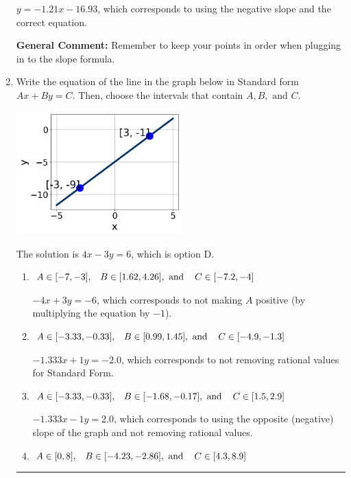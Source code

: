 \documentclass{extbook}[14pt]
\newcommand{\litem}[1]{\item #1

\rule{\textwidth}{0.4pt}}
\begin{document}
\begin{enumerate}
{\begin{enumerate}[label=\Alph*.]
 $y = -1.21x -16.93$, which corresponds to using the negative slope and the correct equation.
\end{enumerate}

\textbf{General Comment:} Remember to keep your points in order when plugging in to the slope formula.
}
\litem{
Write the equation of the line in the graph below in Standard form $Ax+By=C$. Then, choose the intervals that contain $A, B, \text{ and } C$.

\begin{center}
    \includegraphics[width=0.5\textwidth]{../Figures/linearGraphToStandardCopyC.png}
\end{center}



The solution is \( 4x - 3y = 6 \), which is option D.\begin{enumerate}[label=\Alph*.]
\item \( A \in [-7, -3], \hspace{3mm} B \in [1.62, 4.26], \text{ and } \hspace{3mm} C \in [-7.2, -4] \)

 $-4x + 3y = -6$, which corresponds to not making $A$ positive (by multiplying the equation by $-1$).
\item \( A \in [-3.33, -0.33], \hspace{3mm} B \in [0.99, 1.45], \text{ and } \hspace{3mm} C \in [-4.9, -1.3] \)

 $-1.333x + 1y = -2.0$, which corresponds to not removing rational values for Standard Form.
\item \( A \in [-3.33, -0.33], \hspace{3mm} B \in [-1.68, -0.17], \text{ and } \hspace{3mm} C \in [1.5, 2.9] \)

 $-1.333x - 1y = 2.0$, which corresponds to using the opposite (negative) slope of the graph and not removing rational values.
\item \( A \in [0, 8], \hspace{3mm} B \in [-4.23, -2.86], \text{ and } \hspace{3mm} C \in [4.3, 8.9] \)


\end{enumerate}}
\end{enumerate}
\end{document}
